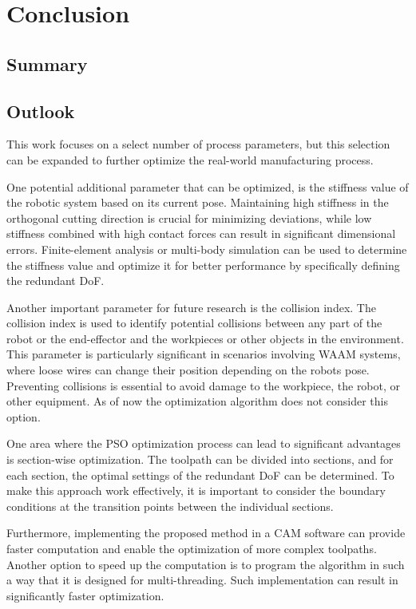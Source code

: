 \chapter{Conclusion}%

\section{Summary}%




\section{Outlook}%

This work focuses on a select number of process parameters, but this selection can be expanded to further optimize the real-world manufacturing process.

One potential additional parameter that can be optimized, is the stiffness value of the robotic system based on its current pose. Maintaining high stiffness in the orthogonal cutting direction is crucial for minimizing deviations, while low stiffness combined with high contact forces can result in significant dimensional errors. Finite-element analysis or multi-body simulation can be used to determine the stiffness value and optimize it for better performance by specifically defining the redundant DoF.

Another important parameter for future research is the collision index. The collision index is used to identify potential collisions between any part of the robot or the end-effector and the workpieces or other objects in the environment. This parameter is particularly significant in scenarios involving WAAM systems, where loose wires can change their position depending on the robots pose. Preventing collisions is essential to avoid damage to the workpiece, the robot, or other equipment. As of now the optimization algorithm does not consider this option.

One area where the PSO optimization process can lead to significant advantages is section-wise optimization. The toolpath can be divided into sections, and for each section, the optimal settings of the redundant DoF can be determined. To make this approach work effectively, it is important to consider the boundary conditions at the transition points between the individual sections.

Furthermore, implementing the proposed method in a CAM software can provide faster computation and enable the optimization of more complex toolpaths. Another option to speed up the computation is to program the algorithm in such a way that it is designed for multi-threading. Such implementation can result in significantly faster optimization.  

